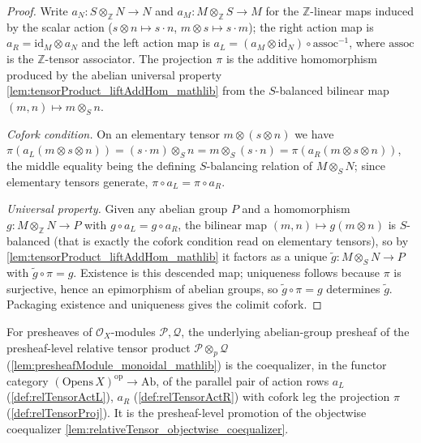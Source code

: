 \begin{proof}
  Write \(a_N : S \otimes_{\mathbb{Z}} N \to N\) and
  \(a_M : M \otimes_{\mathbb{Z}} S \to M\) for the \(\mathbb{Z}\)-linear maps
  induced by the scalar action (\(s \otimes n \mapsto s \cdot n\),
  \(m \otimes s \mapsto s \cdot m\)); the right action map is
  \(a_R = \mathrm{id}_M \otimes a_N\) and the left action map is
  \(a_L = (a_M \otimes \mathrm{id}_N) \circ \mathrm{assoc}^{-1}\), where
  \(\mathrm{assoc}\) is the \(\mathbb{Z}\)-tensor associator. The projection
  \(\pi\) is the additive homomorphism produced by the abelian universal property
  \cref{lem:tensorProduct_liftAddHom_mathlib} from the \(S\)-balanced bilinear map
  \((m, n) \mapsto m \otimes_S n\).

  \emph{Cofork condition.} On an elementary tensor
  \(m \otimes (s \otimes n)\) we have
  \(\pi(a_L(m \otimes s \otimes n)) = (s \cdot m) \otimes_S n
  = m \otimes_S (s \cdot n) = \pi(a_R(m \otimes s \otimes n))\), the middle
  equality being the defining \(S\)-balancing relation of \(M \otimes_S N\); since
  elementary tensors generate, \(\pi \circ a_L = \pi \circ a_R\).

  \emph{Universal property.} Given any abelian group \(P\) and a homomorphism
  \(g : M \otimes_{\mathbb{Z}} N \to P\) with \(g \circ a_L = g \circ a_R\), the
  bilinear map \((m, n) \mapsto g(m \otimes n)\) is \(S\)-balanced (that is exactly
  the cofork condition read on elementary tensors), so by
  \cref{lem:tensorProduct_liftAddHom_mathlib} it factors as a unique
  \(\widetilde{g} : M \otimes_S N \to P\) with \(\widetilde{g} \circ \pi = g\).
  Existence is this descended map; uniqueness follows because \(\pi\) is
  surjective, hence an epimorphism of abelian groups, so \(\widetilde{g} \circ \pi
  = g\) determines \(\widetilde{g}\). Packaging existence and uniqueness gives the
  colimit cofork.

\end{proof}


\begin{lemma}
  \label{lem:relativeTensor_as_coequalizer}
  For presheaves of \(\mathcal{O}_X\)-modules \(\mathcal{P}, \mathcal{Q}\), the
  underlying abelian-group presheaf of the presheaf-level relative tensor product
  \(\mathcal{P} \otimes_p \mathcal{Q}\) (\cref{lem:presheafModule_monoidal_mathlib})
  is the coequalizer, in the functor category
  \((\mathrm{Opens}\,X)^{\mathrm{op}} \to \mathrm{Ab}\), of the parallel pair of
  action rows \(a_L\) (\cref{def:relTensorActL}), \(a_R\)
  (\cref{def:relTensorActR}) with cofork leg the projection \(\pi\)
  (\cref{def:relTensorProj}). It is the presheaf-level promotion of the objectwise
  coequalizer \cref{lem:relativeTensor_objectwise_coequalizer}.
\end{lemma}


